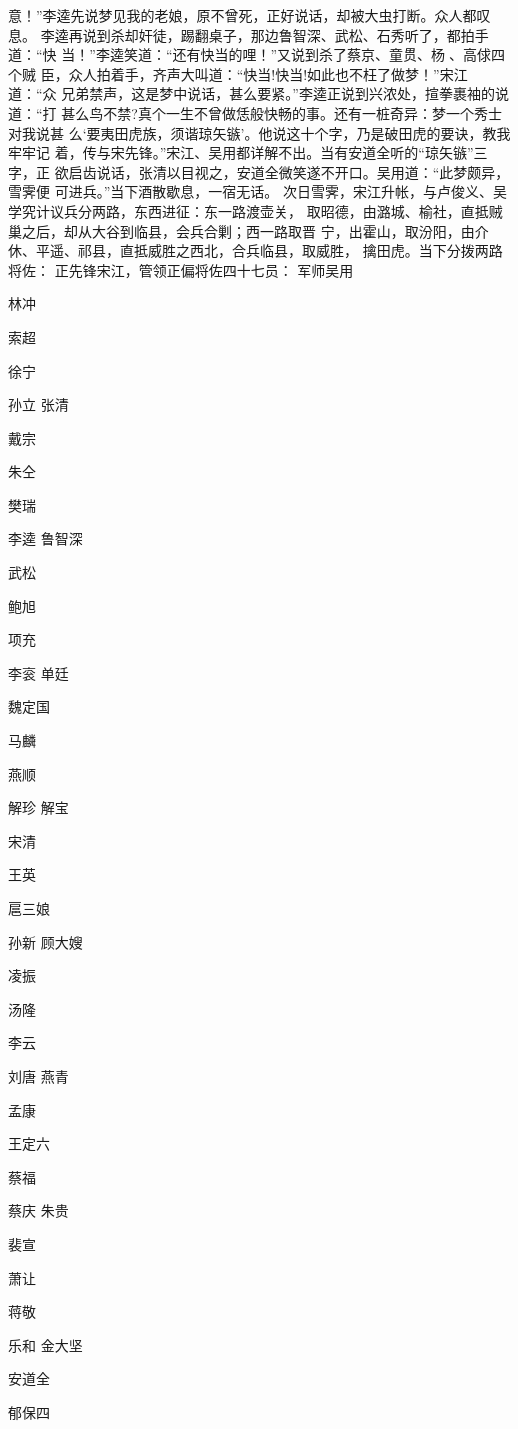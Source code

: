 意！”李逵先说梦见我的老娘，原不曾死，正好说话，却被大虫打断。众人都叹息。
李逵再说到杀却奸徒，踢翻桌子，那边鲁智深、武松、石秀听了，都拍手道：“快
当！”李逵笑道：“还有快当的哩！”又说到杀了蔡京、童贯、杨、高俅四个贼
臣，众人拍着手，齐声大叫道：“快当!快当!如此也不枉了做梦！”宋江道：“众
兄弟禁声，这是梦中说话，甚么要紧。”李逵正说到兴浓处，揎拳裹袖的说道：“打
甚么鸟不禁?真个一生不曾做恁般快畅的事。还有一桩奇异：梦一个秀士对我说甚
么‘要夷田虎族，须谐琼矢镞’。他说这十个字，乃是破田虎的要诀，教我牢牢记
着，传与宋先锋。”宋江、吴用都详解不出。当有安道全听的“琼矢镞”三字，正
欲启齿说话，张清以目视之，安道全微笑遂不开口。吴用道：“此梦颇异，雪霁便
可进兵。”当下酒散歇息，一宿无话。
次日雪霁，宋江升帐，与卢俊义、吴学究计议兵分两路，东西进征：东一路渡壶关，
取昭德，由潞城、榆社，直抵贼巢之后，却从大谷到临县，会兵合剿；西一路取晋
宁，出霍山，取汾阳，由介休、平遥、祁县，直抵威胜之西北，合兵临县，取威胜，
擒田虎。当下分拨两路将佐：
正先锋宋江，管领正偏将佐四十七员：
军师吴用

林冲

索超

徐宁

孙立
张清

戴宗

朱仝

樊瑞

李逵
鲁智深

武松

鲍旭

项充

李衮
单廷

魏定国

马麟

燕顺

解珍
解宝

宋清

王英

扈三娘

孙新
顾大嫂

凌振

汤隆

李云

刘唐
燕青

孟康

王定六

蔡福

蔡庆
朱贵

裴宣

萧让

蒋敬

乐和
金大坚

安道全

郁保四

